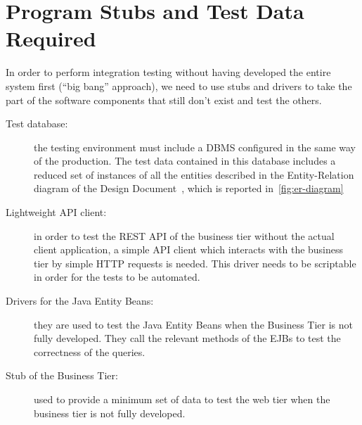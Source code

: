 \chapter{Program Stubs and Test Data Required}
\label{chap:stubs}

In order to perform integration testing without having developed the entire system first (``big bang'' approach), we need to use stubs and drivers to take the part of the software components that still don't exist and test the others.

\begin{description}
    \item[Test database:] the testing environment must include a DBMS configured in the same way of the production. The test data contained in this database includes a reduced set of instances of all the entities described in the Entity-Relation diagram of the Design Document~\cite[p.~10]{mytaxi-dd}, which is reported in~\autoref{fig:er-diagram}

    \item[Lightweight API client:] in order to test the REST API of the business tier without the actual client application, a simple API client which interacts with the business tier by simple HTTP requests is needed. This driver needs to be scriptable in order for the tests to be automated.

    \item[Drivers for the Java Entity Beans:] they are used to test the Java Entity Beans when the Business Tier is not fully developed. They call the relevant methods of the EJBs to test the correctness of the queries.

    \item[Stub of the Business Tier:] used to provide a minimum set of data to test the web tier when the business tier is not fully developed.
\end{description}

